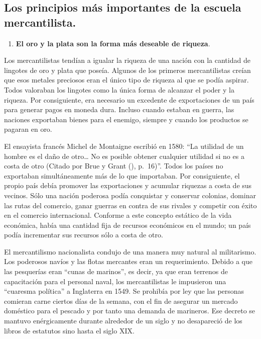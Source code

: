 \documentclass[
  stu,
  floatsintext,
  longtable,
  a4paper,
  nolmodern,
  notxfonts,
  notimes,
  12pt,
  colorlinks=true,linkcolor=blue,citecolor=blue,urlcolor=blue]{apa7}
\providecommand{\tightlist}{%
  \setlength{\itemsep}{0pt}\setlength{\parskip}{0pt}}
\begin{document}
\subsection{Los principios más importantes de la escuela
mercantilista.}\label{los-principios-muxe1s-importantes-de-la-escuela-mercantilista.}

\begin{enumerate}
\def\labelenumi{\arabic{enumi}.}
\tightlist
\item
  \hspace{0pt} \textbf{El oro y la plata son la forma más deseable de
  riqueza}.
\end{enumerate}

Los mercantilistas tendían a igualar la riqueza de una nación con la
cantidad de lingotes de oro y plata que poseía. Algunos de los primeros
mercantilistas creían que esos metales preciosos eran el único tipo de
riqueza al que se podía aspirar. Todos valoraban los lingotes como la
única forma de alcanzar el poder y la riqueza. Por consiguiente, era
necesario un excedente de exportaciones de un país para generar pagos en
moneda dura. Incluso cuando estaban en guerra, las naciones exportaban
bienes para el enemigo, siempre y cuando los productos se pagaran en
oro.

El ensayista francés Michel de Montaigne escribió en 1580: ``La utilidad
de un hombre es el daño de otro\ldots{} No es posible obtener cualquier
utilidad si no es a costa de otro (Citado por Brue y Grant
(), p.~16)''.
Todos los países no exportaban simultáneamente más de lo que importaban.
Por consiguiente, el propio país debía promover las exportaciones y
acumular riquezas a costa de sus vecinos. Sólo una nación poderosa podía
conquistar y conservar colonias, dominar las rutas del comercio, ganar
guerras en contra de sus rivales y competir con éxito en el comercio
internacional. Conforme a este concepto estático de la vida económica,
había una cantidad fija de recursos económicos en el mundo; un país
podía incrementar sus recursos sólo a costa de otro.

El mercantilismo nacionalista condujo de una manera muy natural al
militarismo. Los poderosos navíos y las flotas mercantes eran un
requerimiento. Debido a que las pesquerías eran ``cunas de marinos'', es
decir, ya que eran terrenos de capacitación para el personal naval, los
mercantilistas le impusieron una ``cuaresma política'' a Inglaterra en
1549. Se prohibía por ley que las personas comieran carne ciertos días
de la semana, con el fin de asegurar un mercado doméstico para el
pescado y por tanto una demanda de marineros. Ese decreto se mantuvo
enérgicamente durante alrededor de un siglo y no desapareció de los
libros de estatutos sino hasta el siglo XIX.
\end{document}
